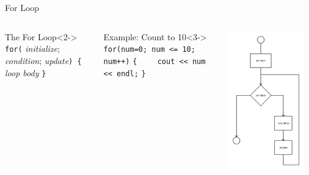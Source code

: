 \documentclass[]{beamer}
\begin{document}
\begin{frame}[fragile]{For Loop}
\begin{columns}
    \begin{block}{The For Loop}<2->
        \verb!for(! \textit{initialize}; \textit{condition}; \textit{update}\verb!) {!
        \newline\verb!    !\textit{loop body}
        \newline\verb!}!
    \end{block}

    \begin{block}{Example: Count to 10}<3->
        \verb!for(num=0; num <= 10; num++)!
        \newline\verb!{!
        \newline\verb!    cout << num << endl;!
        \newline\verb!}!
    \end{block}

    \includegraphics[width=0.9\textwidth]{images/for}
\end{columns}
\end{frame}
\end{document}
